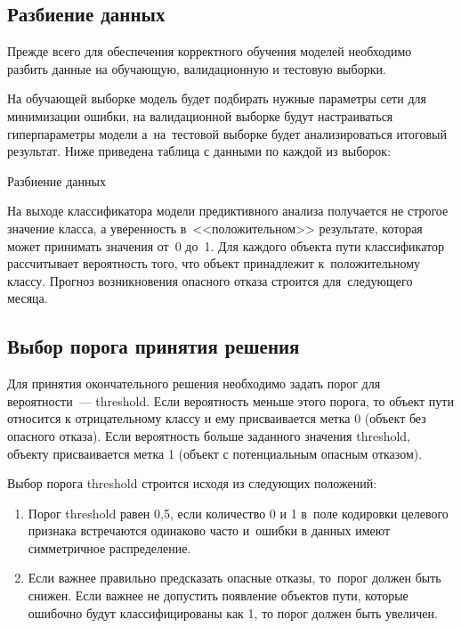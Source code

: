 \subsection{Разбиение данных} %


Прежде всего для обеспечения корректного обучения моделей необходимо разбить данные
на обучающую, валидационную и тестовую выборки. 

На обучающей выборке модель будет подбирать
нужные параметры сети для минимизации ошибки, на валидационной выборке будут настраиваться гиперпараметры модели
а~на~тестовой выборке будет анализироваться итоговый результат.\linebreak
Ниже приведена таблица с данными по каждой из выборок:
\begin{table}[!h]\label{split_table}\centering
	\caption{Разбиение данных}\medskip
	
	
\end{table}

На выходе классификатора модели предиктивного анализа получается не 
строгое значение класса, а уверенность в~<<положительном>> результате, 
которая может принимать значения от~0 до~1. Для каждого объекта пути 
классификатор рассчитывает вероятность того, что объект принадлежит к~положительному классу.
Прогноз возникновения опасного отказа строится для~следующего месяца.

\subsection{Выбор порога принятия решения}

Для принятия окончательного решения необходимо задать порог для вероятности~--- threshold. 
Если вероятность меньше этого порога, то объект пути относится к отрицательному 
классу и ему присваивается метка 0 (объект без опасного отказа). 
Если вероятность больше заданного значения threshold, объекту присваивается 
метка 1 (объект с потенциальным опасным отказом).

Выбор порога threshold строится исходя из следующих положений:

\begin{enumerate}[wide]
	\item Порог threshold равен 0,5, если количество 0 и 1 в~поле кодировки целевого 
	признака встречаются одинаково часто и~ошибки в данных имеют симметричное распределение.
	
	\item Если важнее правильно предсказать опасные отказы, то~порог должен быть снижен. 
	Если важнее не допустить появление объектов пути, которые ошибочно будут 
	классифицированы как 1, то порог должен быть увеличен.
\end{enumerate}



